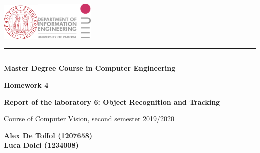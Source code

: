 \documentclass[a4paper,titlepaget]{article}
\date{15 May 2020}
\begin{document}
	\begin{titlepage}
		\begin{center}
			\includegraphics[width=1.8cm, height=1.8cm]{Images/logounipd}\qquad{}\qquad\qquad\includegraphics[width=2.8cm, height=1.9cm]{images/logodei}
		\end{center}
		\begin{center}
            \rule[0.1cm]{15.8cm}{0.1mm}
			\rule[0.5cm]{15.8cm}{0.6mm}
			{\small{\bf Master Degree Course in Computer Engineering}}
			
		\end{center}
		\vspace{40mm}
		\begin{center}
			{\LARGE{\bf Homework 4}}
			
			\vspace{7mm}
			
			{\Large{\bf Report of the laboratory 6: Object Recognition and Tracking}}
			
			\vspace{15mm} 
			{\large{Course of Computer Vision, second semester 2019/2020}}
			\vspace{19mm} 
		\end{center}
		\vspace{10mm}
		\par
		\vspace{40mm}
			\begin{minipage}{0.5\textwidth}
				{\large{\bf Alex De Toffol (1207658)\\}}
				\newline
				{\large{\bf Luca Dolci (1234008)\\}}
			\end{minipage}%
			\begin{minipage}{0.5\textwidth}
			\end{minipage}%
	\end{titlepage}

\newpage
\end{document}
